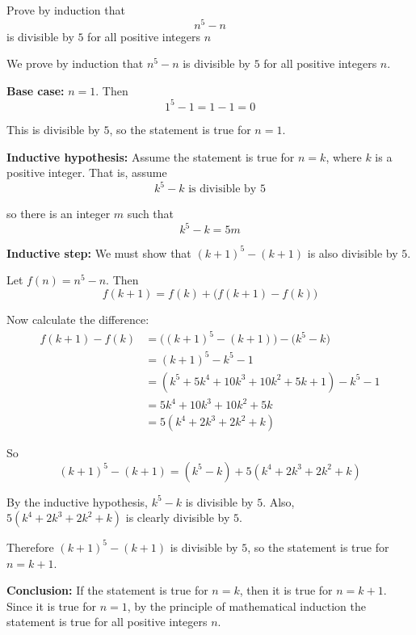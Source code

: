 \documentclass[leqno]{article}
\begin{document}
\djsFrontMatter
\begin{enumerate}[
  label=\textbf{\arabic*.},
  leftmargin=*,
  topsep=0pt,
  partopsep=0pt,
  parsep=0pt
]

\questionitem

Prove by induction that \[n^5-n\] is divisible by $5$ for all positive integers $n$ 

\vspace*{10pt}

\begin{djsSolution}
We prove by induction that \(n^5-n\) is divisible by \(5\) for all positive integers \(n\).

\textbf{Base case:} \(n=1\). Then
\[
1^5-1=1-1=0
\]

This is divisible by \(5\), so the statement is true for \(n=1\).

\textbf{Inductive hypothesis:} Assume the statement is true for \(n=k\), where \(k\) is a positive integer. That is, assume
\[
k^5-k \text{ is divisible by } 5
\]

so there is an integer \(m\) such that
\[
k^5-k=5m
\]

\textbf{Inductive step:} We must show that \((k+1)^5-(k+1)\) is also divisible by \(5\).

Let \(f(n)=n^5-n\). Then
\[
f(k+1)=f(k)+\bigl(f(k+1)-f(k)\bigr)
\]

Now calculate the difference:
\begin{align*}
f(k+1)-f(k)
&=\bigl((k+1)^5-(k+1)\bigr)-\bigl(k^5-k\bigr)\\
&=(k+1)^5-k^5-1\\
&=\left(k^5+5k^4+10k^3+10k^2+5k+1\right)-k^5-1\\
&=5k^4+10k^3+10k^2+5k\\
&=5(k^4+2k^3+2k^2+k)
\end{align*}

So
\[
(k+1)^5-(k+1)=(k^5-k)+5(k^4+2k^3+2k^2+k)
\]

By the inductive hypothesis, \(k^5-k\) is divisible by \(5\).
Also, \(5(k^4+2k^3+2k^2+k)\) is clearly divisible by \(5\).

Therefore \((k+1)^5-(k+1)\) is divisible by \(5\), so the statement is true for \(n=k+1\).

\textbf{Conclusion:} If the statement is true for \(n=k\), then it is true for \(n=k+1\). Since it is true for \(n=1\), by the principle of mathematical induction the statement is true for all positive integers \(n\).
\end{djsSolution}



\end{enumerate}
\end{document}
